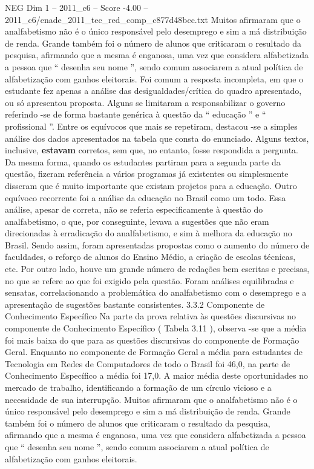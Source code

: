 \begin{textsample}{NEG Dim 1 – 2011\_c6 – Score -4.00 – 2011\_c6/enade\_2011\_tec\_red\_comp\_c877d48bcc.txt}
Muitos afirmaram que o analfabetismo não é o único responsável pelo desemprego e sim a má distribuição de renda.
Grande também foi o número de alunos que criticaram o resultado da pesquisa, afirmando que a mesma é enganosa, uma vez que considera alfabetizada a pessoa que “ desenha seu nome ”, sendo comum associarem a atual política de alfabetização com ganhos eleitorais.
Foi comum a resposta incompleta, em que o estudante fez apenas a análise das desigualdades/crítica do quadro apresentado, ou só apresentou proposta.
Alguns se limitaram a responsabilizar o governo referindo -se de forma bastante genérica à questão da “ educação ” e “ profissional ”.
Entre os equívocos que mais se repetiram, destacou -se a simples análise dos dados apresentados na tabela que consta do enunciado.
Alguns textos, inclusive, \textbf{estavam} corretos, sem que, no entanto, fosse respondida a pergunta.
Da mesma forma, quando os estudantes partiram para a segunda parte da questão, fizeram referência a vários programas já existentes ou simplesmente disseram que é muito importante que existam projetos para a educação.
Outro equívoco recorrente foi a análise da educação no Brasil como um todo.
Essa análise, apesar de correta, não se referia especificamente à questão do analfabetismo, o que, por conseguinte, levava a sugestões que não eram direcionadas à erradicação do analfabetismo, e sim à melhora da educação no Brasil.
Sendo assim, foram apresentadas propostas como o aumento do número de faculdades, o reforço de alunos do Ensino Médio, a criação de escolas técnicas, etc.
Por outro lado, houve um grande número de redações bem escritas e precisas, no que se refere ao que foi exigido pela questão.
Foram análises equilibradas e sensatas, correlacionando a problemática do analfabetismo com o desemprego e a apresentação de sugestões bastante consistentes. 3.3.2 Componente de Conhecimento Específico Na parte da prova relativa às questões discursivas no componente de Conhecimento Específico ( Tabela 3.11 ), observa -se que a média foi mais baixa do que para as questões discursivas do componente de Formação Geral.
Enquanto no componente de Formação Geral a média para estudantes de Tecnologia em Redes de Computadores de todo o Brasil foi 46,0, na parte de Conhecimento Específico a média foi 17,0.
A maior média deste oportunidades no mercado de trabalho, identificando a formação de um círculo vicioso e a necessidade de sua interrupção.
Muitos afirmaram que o analfabetismo não é o único responsável pelo desemprego e sim a má distribuição de renda.
Grande também foi o número de alunos que criticaram o resultado da pesquisa, afirmando que a mesma é enganosa, uma vez que considera alfabetizada a pessoa que “ desenha seu nome ”, sendo comum associarem a atual política de alfabetização com ganhos eleitorais.

\end{textsample}
